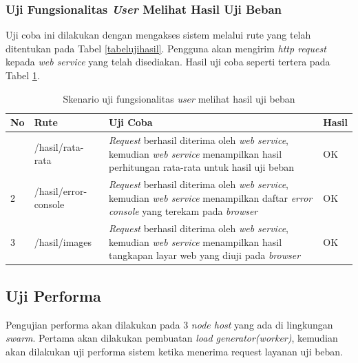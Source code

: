 			\subsubsection{Uji Fungsionalitas \textit{User} Melihat Hasil Uji Beban}
				Uji coba ini dilakukan dengan mengakses sistem melalui rute yang telah ditentukan pada Tabel \ref{tabelujihasil}. Pengguna akan mengirim \textit{http request} kepada \textit{web service} yang telah
				disediakan. Hasil uji coba seperti tertera pada Tabel \ref{tabelhasilujihasil}.
				\begin{longtable}{|p{}|p{}|p{}|p{}|}
					\caption{Skenario uji fungsionalitas \textit{user} melihat hasil uji beban} \label{tabelhasilujihasil} \\ \hline
					\textbf{No} & \textbf{Rute} & \textbf{Uji Coba} & \textbf{Hasil} \\ \hline
					\endhead
					\endfoot
					\endlastfoot
					1 & /hasil/rata-rata & \textit{Request} berhasil diterima oleh \textit{web service}, kemudian \textit{web service} menampilkan hasil perhitungan rata-rata untuk hasil uji beban & OK \\ \hline
					2 & /hasil/error-console & \textit{Request} berhasil diterima oleh \textit{web service}, kemudian \textit{web service} menampilkan daftar \textit{error console} yang terekam pada \textit{browser} & OK \\ \hline
					3 & /hasil/images & \textit{Request} berhasil diterima oleh \textit{web service}, kemudian \textit{web service} menampilkan hasil tangkapan layar web yang diuji pada \textit{browser} & OK \\ \hline
				\end{longtable}
				

		\subsection{Uji Performa}
			Pengujian performa akan dilakukan pada 3 \textit{node host} yang ada di lingkungan \textit{swarm}. Pertama akan dilakukan pembuatan \textit{load generator(worker)}, kemudian akan dilakukan uji performa sistem ketika menerima request layanan uji beban.
			
